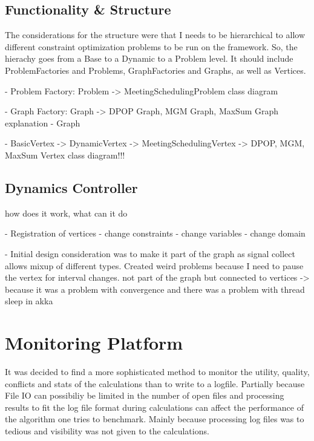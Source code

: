 \subsection{Functionality \& Structure}

The considerations for the structure were that I needs to be hierarchical to allow different constraint optimization problems to be run on the framework. So, the hierachy goes from a Base to a Dynamic to a Problem level. It should include ProblemFactories and Problems, GraphFactories and Graphs, as well as Vertices.\newline\newline

- Problem Factory: Problem -> MeetingSchedulingProblem class diagram

- Graph Factory: Graph -> DPOP Graph, MGM Graph, MaxSum Graph explanation 
- Graph

- BasicVertex -> DynamicVertex -> MeetingSchedulingVertex -> DPOP, MGM, MaxSum Vertex class diagram!!!

\subsection{Dynamics Controller}

how does it work, what can it do

- Registration of vertices
- change constraints
- change variables
- change domain

- Initial design consideration was to make it part of the graph as signal collect allows mixup of different types. Created weird problems because I need to pause the vertex for interval changes. not part of the graph but connected to vertices -> because it was a problem with convergence and there was a problem with thread sleep in akka

\section{Monitoring Platform}

It was decided to find a more sophisticated method to monitor the utility, quality, conflicts and stats of the calculations than to write to a logfile. Partially because File IO can possibiliy be limited in the number of open files and processing results to fit the log file format during calculations can affect the performance of the algorithm one tries to benchmark. Mainly because processing log files was to tedious and visibility was not given to the calculations.

